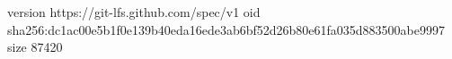 version https://git-lfs.github.com/spec/v1
oid sha256:dc1ac00e5b1f0e139b40eda16ede3ab6bf52d26b80e61fa035d883500abe9997
size 87420

